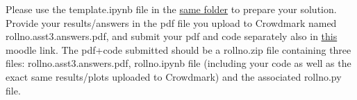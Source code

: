 \documentclass[solution,addpoints,12pt]{exam}
\begin{document}
\begin{questions}
Please use the template.ipynb file in the \href{https://drive.google.com/drive/folders/1FGEPZnzeK6SvoNVMRIj834ORsT0YMjtk?usp=sharing}{same folder} to prepare your solution. Provide your results/answers in the pdf file you upload to Crowdmark named rollno.asst3.answers.pdf, and submit your pdf and code separately also in \href{https://coursesnew.iitm.ac.in/mod/assign/view.php?id=27792}{this} moodle link. The pdf+code submitted should be a rollno.zip file containing three files: rollno.asst3.answers.pdf,  rollno.ipynb file (including your code as well as the exact same results/plots uploaded to Crowdmark) and the associated rollno.py file. 
\end{questions}
\end{document}
